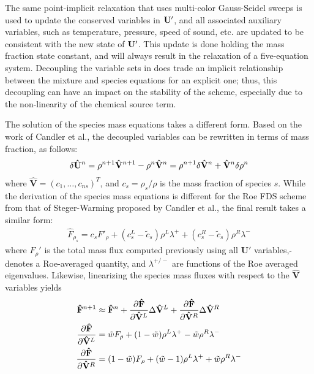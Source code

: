 The same point-implicit relaxation that uses multi-color Gauss-Seidel sweeps is
used to update the conserved variables in $\mathbf U '$, and all associated
auxiliary variables, such as temperature, pressure, speed of sound, etc. are
updated to be consistent with the new state of $\mathbf U '$.  This update is done
holding the mass fraction state constant, and will always result in the
relaxation of a five-equation system.  Decoupling the variable sets in
 does trade an implicit relationship between the mixture and
species equations for an explicit one; thus, this decoupling can have an impact
on the stability of the scheme, especially due to the non-linearity of the
chemical source term\cite{park}.
 
The solution of the species mass equations takes a different form.  Based on the
work of Candler et al.\cite{candler}, the decoupled variables can be rewritten
in terms of mass fraction, as follows:
\begin{equation} 
  \delta \mathbf{\hat{U}}^n 
  = \rho^{n+1} \mathbf{\hat{V}}^{n+1} - \rho^n\mathbf{\hat{V}}^n 
  = \rho^{n+1} \delta \mathbf{\hat{V}}^n + \mathbf{\hat{V}}^n \delta \rho^n
  \label{du-to-dv-mass-frac}
\end{equation}
where $\mathbf{\hat{V}}=(c_1,\hdots,c_{ns})^T$, and $c_s=\rho_s/\rho$ is the
mass fraction of species $s$.  While the derivation of the species mass
equations is different for the Roe FDS scheme from that of Steger-Warming
proposed by Candler et al.\cite{candler}, the final result takes a similar form: 
\begin{gather}
  \hat{F}_{\rho_s} 
  = c_s F'_\rho+(c_s^L-\tilde{c}_s)\rho^L\lambda^+
  + (c_s^R-\tilde{c}_s)\rho^R\lambda^-
  \label{dc-flux}
\end{gather}
where $F_\rho'$ is the total mass flux computed previously using all
$\mathbf{U}'$ variables, $\tilde{}$ denotes a Roe-averaged quantity, and
$\lambda^{+/-}$ are functions of the Roe averaged eigenvalues.  Likewise,
linearizing the species mass fluxes with respect to the $\mathbf{\hat{V}}$
variables yields
\begin{align} 
  \mathbf{\hat{F}}^{n+1} &\approx
  \mathbf{\hat{F}}^n 
  + \frac{\partial \mathbf{\hat{F}}}{\partial \mathbf{\hat{V}}^L} \Delta \mathbf{\hat{V}}^L 
  + \frac{\partial \mathbf{\hat{F}}}{\partial \mathbf{\hat{V}}^R} \Delta \mathbf{\hat{V}}^R
  \label{flux-dc-taylor} \\
  \frac{\partial \mathbf{\hat{F}}}{\partial \mathbf{\hat{V}}^L} &= 
  \tilde{w} F_\rho+(1-\tilde{w})\rho^L\lambda^+ - \tilde{w} \rho^R\lambda^- 
  \label{dfdvl} \\
  \frac{\partial \mathbf{\hat{F}}}{\partial \mathbf{\hat{V}}^R} &= 
  ( 1-\tilde{w} )F_\rho+(\tilde{w} -1)\rho^L\lambda^+ + \tilde{w} \rho^R\lambda^- 
  \label{dfdvr}
\end{align}
